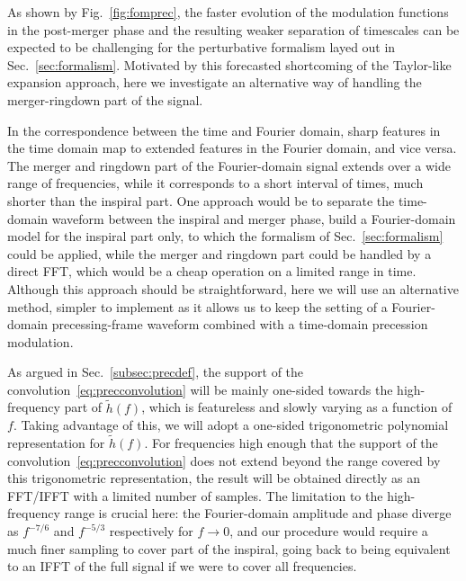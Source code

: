 \documentclass[aps,showpacs,twocolumn,
prd,superscriptaddress,nofootinbib]{revtex4-1}
\begin{document}
As shown by Fig.~\ref{fig:fomprec}, the faster evolution of the modulation functions in the post-merger phase and the resulting weaker separation of timescales can be expected to be challenging for the perturbative formalism layed out in Sec.~\ref{sec:formalism}. Motivated by this forecasted shortcoming of the Taylor-like expansion approach, here we investigate an alternative way of handling the merger-ringdown part of the signal.

In the correspondence between the time and Fourier domain, sharp features in the time domain map to extended features in the Fourier domain, and vice versa. The merger and ringdown part of the Fourier-domain signal extends over a wide range of frequencies, while it corresponds to a short interval of times, much shorter than the inspiral part. One approach would be to separate the time-domain waveform between the inspiral and merger phase, build a Fourier-domain model for the inspiral part only, to which the formalism of Sec.~\ref{sec:formalism} could be applied, while the merger and ringdown part could be handled by a direct FFT, which would be a cheap operation on a limited range in time. Although this approach should be straightforward, here we will use an alternative method, simpler to implement as it allows us to keep the setting of a Fourier-domain precessing-frame waveform combined with a time-domain precession modulation.

As argued in Sec.~\ref{subsec:precdef}, the support of the convolution~\eqref{eq:precconvolution} will be mainly one-sided towards the high-frequency part of $\tilde{h}(f)$, which is featureless and slowly varying as a function of $f$. Taking advantage of this, we will adopt a one-sided trigonometric polynomial representation for $\tilde{h}(f)$. For frequencies high enough that the support of the convolution~\eqref{eq:precconvolution} does not extend beyond the range covered by this trigonometric representation, the result will be obtained directly as an FFT/IFFT with a limited number of samples. The limitation to the high-frequency range is crucial here: the Fourier-domain amplitude and phase diverge as $f^{-7/6}$ and $f^{-5/3}$ respectively for $f \rightarrow 0$, and our procedure would require a much finer sampling to cover part of the inspiral, going back to being equivalent to an IFFT of the full signal if we were to cover all frequencies.
\end{document}
